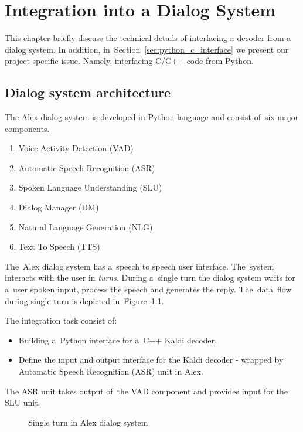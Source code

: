 \chapter{Integration into a Dialog System}
\label{cha:integration}
This chapter briefly discuss the technical details of interfacing
a decoder from a dialog system.
In addition, in~Section~\ref{sec:python_c_interface} we present our project specific issue.
Namely, interfacing C/C++ code from Python.


\section{Dialog system architecture} 
\label{sec:dialog_system_architecture}
The Alex dialog system is developed in Python language and consist of~six major components. 
\begin{enumerate}
    \item Voice Activity Detection (VAD)
    \item Automatic Speech Recognition (ASR) 
    \item Spoken Language Understanding (SLU)
    \item Dialog Manager (DM)
    \item Natural Language Generation (NLG)
    \item Text To Speech (TTS)
\end{enumerate}
The~Alex dialog system has a~speech to speech user interface. The~system interacts with the user in {\it turns}. During a~single turn the dialog system waits for a~user spoken input, process the speech and generates the reply.
The~data~flow during single turn is depicted in~Figure~\ref{fig:dialog_system}.

The integration task consist of:
\begin{itemize}
    \item Building a~Python interface for a~C++ Kaldi decoder.
    \item Define the input and output interface for the Kaldi decoder - wrapped by Automatic Speech Recognition (ASR) unit in Alex.
\end{itemize}
 The ASR unit takes output of~the VAD component and provides input for the SLU unit. 

\begin{figure}
    \begin{center}
    
    \caption{Single turn in Alex dialog system}
    \label{fig:dialog_system} 
    \end{center}
\end{figure}

